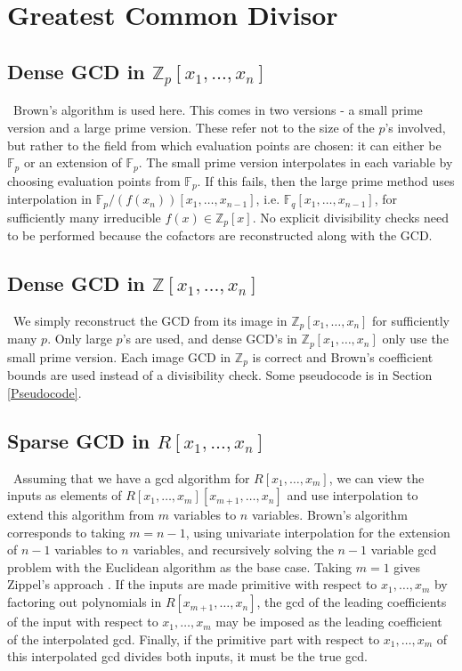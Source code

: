 \documentclass[11pt,reqno]{amsart}
\numberwithin{equation}{section}
\newcommand{\bbZ}[0]  { \mathbb{Z}}
\newcommand{\bbF}[0]  { \mathbb{F}}
\begin{document}
\section{Greatest Common Divisor}

\subsection{Dense GCD in $\bbZ_p[x_1,\dots,x_n]$}\
Brown's algorithm \cite{Brown} is used here. This comes in two versions - a 
small prime version and a large prime version. These refer not to the size of 
the $p$'s involved, but rather to the field from which evaluation points are 
chosen: it can either be $\bbF_p$ or an extension of $\bbF_p$. The small prime 
version interpolates in each variable by choosing evaluation points from 
$\bbF_p$. If this fails, then the large prime method uses interpolation in 
$\bbF_p/(f(x_n))[x_1,\dots,x_{n-1}]$, i.e. $\bbF_q[x_1,\dots,x_{n-1}]$, for 
sufficiently many irreducible $f(x) \in \bbZ_p[x]$. No explicit divisibility 
checks need to be performed because the cofactors are reconstructed along with 
the GCD.

\subsection{Dense GCD in $\bbZ[x_1,\dots,x_n]$}\
We simply reconstruct the GCD from its image in $\bbZ_p[x_1,\dots,x_n]$ for 
sufficiently many $p$. Only large $p$'s are used, and dense GCD's in 
$\bbZ_p[x_1,\dots,x_n]$ only use the small prime version. Each image GCD in 
$\bbZ_p$ is correct and Brown's coefficient bounds \cite{Brown} are used 
instead of a divisibility check. Some pseudocode is in Section \ref{Pseudocode}.

\subsection{Sparse GCD in $R[x_1,\dots,x_n]$}\
Assuming that we have a gcd algorithm for $R[x_1,\dots,x_m]$, we can view the 
inputs as elements of $R[x_1,\dots,x_m][x_{m+1},\dots,x_n]$ and use 
interpolation to extend this algorithm from $m$ variables to $n$ variables. 
Brown's algorithm corresponds to taking $m=n-1$, using univariate interpolation 
for the extension of $n-1$ variables to $n$ variables, and recursively solving 
the $n-1$ variable gcd problem with the Euclidean algorithm as the base case. 
Taking $m=1$ gives Zippel's approach \cite{ZIPPEL}.
If the inputs are made primitive with respect to $x_1,\dots,x_m$ by factoring 
out polynomials in $R[x_{m+1},\dots,x_n]$, the gcd of the leading coefficients 
of the input with respect to $x_1,\dots,x_m$ may be imposed as the leading 
coefficient of the interpolated gcd. Finally, if the primitive part with 
respect to $x_1,\dots,x_m$ of this interpolated gcd divides both inputs, it 
must be the true gcd.
\end{document}
